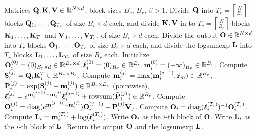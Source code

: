 \documentclass{article} %
\begin{document}
\begin{algorithm}[h!]
  \caption{Stablized Flash Attention by Mitigating Biased Rounding Error: Forward Pass}\label{alg:SFA}
  \begin{algorithmic}[1]
    \REQUIRE Matrices ${\mathbf{Q}}, {\mathbf{K}}, {\mathbf{V}} \in \mathbb{R}^{N \times d}$, block sizes $B_c$, $B_r$, $\beta>1$.
    \STATE Divide ${\mathbf{Q}}$ into $T_r = \left\lceil\frac{N}{B_r} \right\rceil$ blocks ${\mathbf{Q}}_1, \dots, {\mathbf{Q}}_{T_r}$ of size $B_r \times d$ each,
    and divide ${\mathbf{K}}, {\mathbf{V}}$ in to $T_c = \left\lceil \frac{N}{B_c} \right\rceil$ blocks ${\mathbf{K}}_1, \dots, {\mathbf{K}}_{T_c}$ and
    ${\mathbf{V}}_1, \dots, {\mathbf{V}}_{T_c}$, of size $B_c \times d$ each.
    \STATE Divide the output ${\mathbf{O}} \in \mathbb{R}^{N \times d}$ into $T_r$ blocks ${\mathbf{O}}_1, \dots, {\mathbf{O}}_{T_r}$ of size
    $B_r \times d$ each, and divide the logsumexp ${\mathbf{L}}$ into $T_r$ blocks ${\mathbf{L}}_1, \dots, {\mathbf{L}}_{T_r}$ of size
    $B_r$ each.
      \STATE Initialize ${\mathbf{O}}_{i}^{(0)} = (0)_{B_r \times d} \in \mathbb{R}^{B_r \times d}, {\boldsymbol{\ell}}_{i}^{(0)} = (0)_{B_r} \in \mathbb{R}^{B_r}, {\mathbf{m}}_{i}^{(0)} = (-\infty)_{B_r} \in \mathbb{R}^{B_r}$.
        \STATE Compute ${\mathbf{S}}_{i}^{(j)} = {\mathbf{Q}}_i {\mathbf{K}}_j^T \in \mathbb{R}^{B_r \times B_c}$.
        \STATE Compute
        ${\mathbf{m}}_{i}^{(j)} = \mathrm{max}({\mathbf{m}}_{i}^{(j-1)}, {\mathbf{r}}_m) \in \mathbb{R}^{B_r}$, $\bar{{\mathbf{P}}}_{i}^{(j)} = \exp({\mathbf{S}}_{i}^{(j)} - {\mathbf{m}}_{i}^{(j)}) \in \mathbb{R}^{B_r \times B_c}$ (pointwise),
        ${\boldsymbol{\ell}}_{i}^{(j)} = e^{{\mathbf{m}}_{i}^{(j-1)} - {\mathbf{m}}_{i}^{(j)}} {\boldsymbol{\ell}}_{i}^{(j-1)} + \mathrm{row sum}(\bar{{\mathbf{P}}}_{i}^{(j)}) \in \mathbb{R}^{B_r}$.
        \STATE Compute
        ${\mathbf{O}}_{i}^{(j)} = \text{diag}(e^{{\mathbf{m}}_{i}^{(j-1)} - {\mathbf{m}}_{i}^{(j)}}) {\mathbf{O}}_{i}^{(j-1)} + \bar{{\mathbf{P}}}_{i}^{(j)} {\mathbf{V}}_j$.
      \ENDFOR
      \STATE Compute ${\mathbf{O}}_{i} = \text{diag}({\boldsymbol{\ell}}_{i}^{(T_c)})^{-1} {\mathbf{O}}_{i}^{(T_c)}$.
      \STATE Compute ${\mathbf{L}}_{i} = {\mathbf{m}}_{i}^{(T_c)} + \log({\boldsymbol{\ell}}_{i}^{(T_c)})$.
      \STATE Write ${\mathbf{O}}_{i}$ as the $i$-th block of ${\mathbf{O}}$.
      \STATE Write ${\mathbf{L}}_{i}$ as the $i$-th block of ${\mathbf{L}}$.
    \ENDFOR
    \STATE Return the output ${\mathbf{O}}$ and the logsumexp ${\mathbf{L}}$.
  \end{algorithmic}
\end{algorithm}
\end{document}
